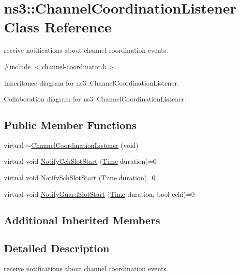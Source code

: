\hypertarget{classns3_1_1ChannelCoordinationListener}{}\section{ns3\+:\+:Channel\+Coordination\+Listener Class Reference}
\label{classns3_1_1ChannelCoordinationListener}


receive notifications about channel coordination events.  




{\ttfamily \#include $<$channel-\/coordinator.\+h$>$}



Inheritance diagram for ns3\+:\+:Channel\+Coordination\+Listener\+:


Collaboration diagram for ns3\+:\+:Channel\+Coordination\+Listener\+:
\subsection*{Public Member Functions}
\begin{DoxyCompactItemize}
\item 
virtual \hyperlink{classns3_1_1ChannelCoordinationListener_a1b68a164f7f7a8e6f6f6c8f32088de50}{$\sim$\+Channel\+Coordination\+Listener} (void)
\item 
virtual void \hyperlink{classns3_1_1ChannelCoordinationListener_a7f8878e2a58e8ae6db357825f3b213e1}{Notify\+Cch\+Slot\+Start} (\hyperlink{classns3_1_1Time}{Time} duration)=0
\item 
virtual void \hyperlink{classns3_1_1ChannelCoordinationListener_a91a7b2109e0dd5d6fc79aa1eb660cbae}{Notify\+Sch\+Slot\+Start} (\hyperlink{classns3_1_1Time}{Time} duration)=0
\item 
virtual void \hyperlink{classns3_1_1ChannelCoordinationListener_a5f0ba3d82edf635ad554551d29ad0073}{Notify\+Guard\+Slot\+Start} (\hyperlink{classns3_1_1Time}{Time} duration, bool cchi)=0
\end{DoxyCompactItemize}
\subsection*{Additional Inherited Members}


\subsection{Detailed Description}
receive notifications about channel coordination events. 

